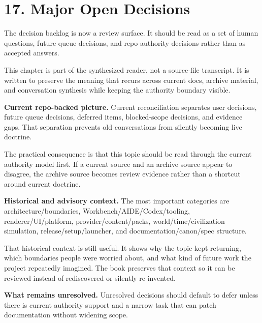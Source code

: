 \documentclass[10.5pt,a4paper,openany]{book}
\begin{document}
\section{17. Major Open Decisions}

The decision backlog is now a review surface.\allowbreak{} It should be read as a set of human questions, future queue decisions, and repo-\allowbreak{}authority decisions rather than as accepted answers.\allowbreak{}


This chapter is part of the synthesized reader, not a source-\allowbreak{}file transcript.\allowbreak{} It is written to preserve the meaning that recurs across current docs, archive material, and conversation synthesis while keeping the authority boundary visible.\allowbreak{}


\textbf{Current repo-backed picture.} Current reconciliation separates user decisions, future queue decisions, deferred items, blocked-\allowbreak{}scope decisions, and evidence gaps.\allowbreak{} That separation prevents old conversations from silently becoming live doctrine.\allowbreak{}


The practical consequence is that this topic should be read through the current authority model first.\allowbreak{} If a current source and an archive source appear to disagree, the archive source becomes review evidence rather than a shortcut around current doctrine.\allowbreak{}


\textbf{Historical and advisory context.} The most important categories are architecture/\allowbreak{}boundaries, Workbench/\allowbreak{}AIDE/\allowbreak{}Codex/\allowbreak{}tooling, renderer/\allowbreak{}UI/\allowbreak{}platform, provider/\allowbreak{}content/\allowbreak{}packs, world/\allowbreak{}time/\allowbreak{}civilization simulation, release/\allowbreak{}setup/\allowbreak{}launcher, and documentation/\allowbreak{}canon/\allowbreak{}spec structure.\allowbreak{}


That historical context is still useful.\allowbreak{} It shows why the topic kept returning, which boundaries people were worried about, and what kind of future work the project repeatedly imagined.\allowbreak{} The book preserves that context so it can be reviewed instead of rediscovered or silently re-\allowbreak{}invented.\allowbreak{}


\textbf{What remains unresolved.} Unresolved decisions should default to defer unless there is current authority support and a narrow task that can patch documentation without widening scope.\allowbreak{}
\end{document}
